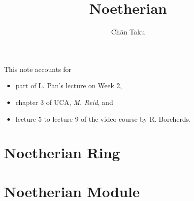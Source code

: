 \documentclass{article}
\title{Noetherian}
\author{Ch\=an Taku}
\begin{document}
\maketitle

This note accounts for
\begin{itemize}
    \item part of L. Pan's lecture on Week 2,
    \item chapter 3 of UCA, \textit{M. Reid}, and
    \item lecture 5 to lecture 9 of the video course by R. Borcherds.
\end{itemize}

\section{Noetherian Ring}

\section{Noetherian Module}

% 
% 
\end{document}
